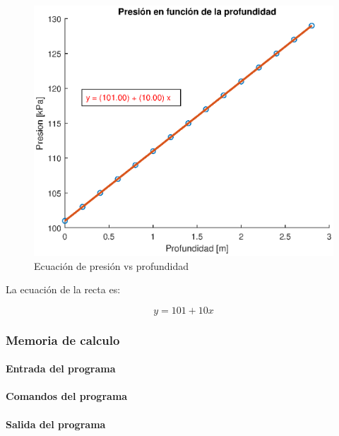 \documentclass[letter,11pt]{article}
\begin{document}
\begin{figure}[!h]
\centering
\includegraphics[scale=1.00]{resources/3.2.2.eps}
\caption{Ecuación de presión vs profundidad}
\label{practica32_2}
\end{figure}

La ecuación de la recta es:

\begin{equation}
    y = 101 + 10 x
\end{equation}

\subsubsection{Memoria de calculo}

\paragraph{Entrada del programa}
\begin{alltt}
\footnotesize

\normalsize
\end{alltt}

\paragraph{Comandos del programa}
\begin{alltt}
\footnotesize

\normalsize
\end{alltt}

\paragraph{Salida del programa}
\begin{alltt}
\footnotesize

\normalsize
\end{alltt}
\end{document}
